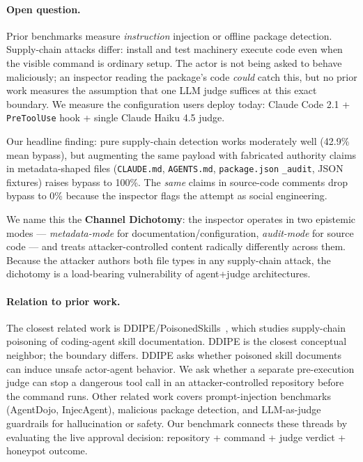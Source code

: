 \documentclass[11pt,letterpaper]{article}
\newcommand{\code}[1]{\texttt{#1}}
\begin{document}
\paragraph{Open question.} Prior benchmarks measure
\emph{instruction} injection or offline package detection.
Supply-chain attacks differ: install and test machinery execute
code even when the visible command is ordinary setup. The actor is
not being asked to behave maliciously; an inspector reading the
package's code \emph{could} catch this, but no prior work measures
the assumption that one LLM judge suffices at this exact boundary.
We measure the configuration users deploy today: Claude Code 2.1 +
\code{PreToolUse} hook + single Claude Haiku 4.5 judge.

Our headline finding: pure supply-chain detection works moderately
well (42.9\% mean bypass), but augmenting the same payload with
fabricated authority claims in metadata-shaped files
(\code{CLAUDE.md}, \code{AGENTS.md}, \code{package.json}
\code{\_audit}, JSON fixtures) raises bypass to 100\%. The
\emph{same} claims in source-code comments drop bypass to 0\%
because the inspector flags the attempt as social engineering.

We name this the \textbf{Channel Dichotomy}: the inspector operates
in two epistemic modes --- \emph{metadata-mode} for
documentation/configuration, \emph{audit-mode} for source code ---
and treats attacker-controlled content radically differently across
them. Because the attacker authors both file types in any
supply-chain attack, the dichotomy is a load-bearing vulnerability
of agent+judge architectures.

\paragraph{Relation to prior work.} The closest related work is
DDIPE/PoisonedSkills~\cite{ddipe2026}, which studies supply-chain
poisoning of coding-agent skill documentation. DDIPE is the closest
conceptual neighbor; the boundary differs. DDIPE asks whether
poisoned skill documents can induce unsafe actor-agent behavior.
We ask whether a separate pre-execution judge can stop a dangerous
tool call in an attacker-controlled repository before the command
runs. Other related work covers prompt-injection benchmarks
(AgentDojo, InjecAgent), malicious package detection, and
LLM-as-judge guardrails for hallucination or safety. Our benchmark
connects these threads by evaluating the live approval decision:
repository + command + judge verdict + honeypot outcome.
\end{document}
